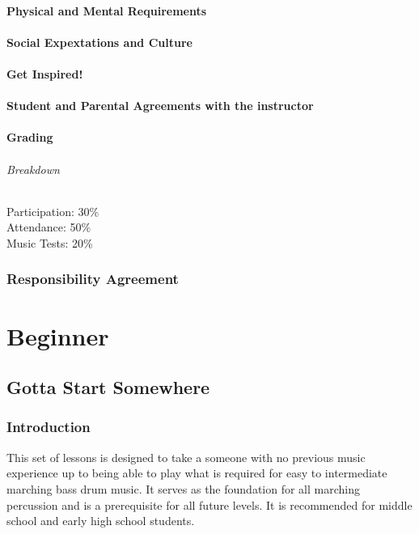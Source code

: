 \documentclass[12pt,letterpaper]{book}
\begin{document}
\subsection*{Physical and Mental Requirements}
\subsection*{Social Expextations and Culture}
\subsection*{Get Inspired!}
\subsection*{Student and Parental Agreements with the instructor}

\subsection*{Grading}
\paragraph{Breakdown}
Participation: 30\%\\
Attendance: 50\%\\
Music Tests: 20\%\\
\newpage

\section*{Responsibility Agreement}







\part{Beginner}

\chapter{Gotta Start Somewhere}

\section*{Introduction}

This set of lessons is designed to take a someone with no previous music experience up to being able to play what is required for easy to intermediate marching bass drum music.  It serves as the foundation for all marching percussion and is a prerequisite for all future levels.  It is recommended for middle school and early high school students.
\end{document}
